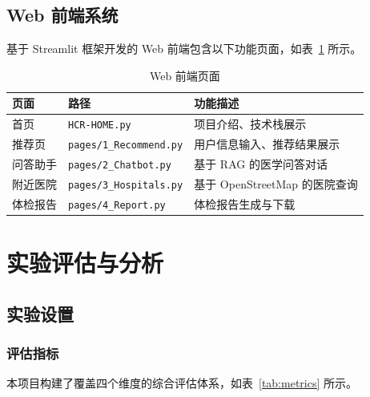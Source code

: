 \documentclass[12pt,a4paper]{article}
\begin{document}
\subsection{Web 前端系统}

基于 Streamlit 框架开发的 Web 前端包含以下功能页面，如表~\ref{tab:web} 所示。

\begin{table}[H]
    \centering
    \caption{Web 前端页面}
    \label{tab:web}
    \begin{tabular}{lll}
        \toprule
        \textbf{页面} & \textbf{路径} & \textbf{功能描述} \\
        \midrule
        首页 & \texttt{HCR-HOME.py} & 项目介绍、技术栈展示 \\
        推荐页 & \texttt{pages/1\_Recommend.py} & 用户信息输入、推荐结果展示 \\
        问答助手 & \texttt{pages/2\_Chatbot.py} & 基于 RAG 的医学问答对话 \\
        附近医院 & \texttt{pages/3\_Hospitals.py} & 基于 OpenStreetMap 的医院查询 \\
        体检报告 & \texttt{pages/4\_Report.py} & 体检报告生成与下载 \\
        \bottomrule
    \end{tabular}
\end{table}

\section{实验评估与分析}
\label{sec:evaluation}

\subsection{实验设置}

\subsubsection{评估指标}

本项目构建了覆盖四个维度的综合评估体系，如表~\ref{tab:metrics} 所示。
\end{document}
